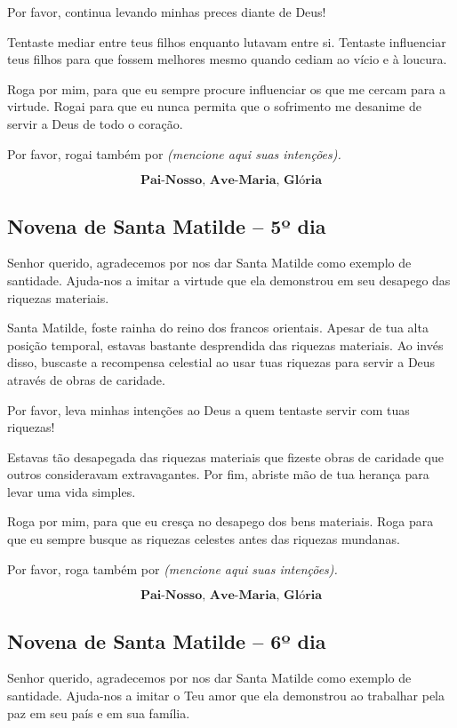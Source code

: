 \documentclass[a4paper,14pt]{extarticle} \usepackage[utf8]{inputenc}
\begin{document}
Por favor, continua levando minhas preces diante de Deus!

Tentaste mediar entre teus filhos enquanto lutavam entre si. Tentaste influenciar teus filhos para que fossem melhores mesmo quando cediam ao vício e à loucura.

Roga por mim, para que eu sempre procure influenciar os que me cercam para a virtude. Rogai para que eu nunca permita que o sofrimento me desanime de servir a Deus de todo o coração.

Por favor, rogai também por \textit{(mencione aqui suas intenções).}

\[\textbf{Pai-Nosso, Ave-Maria, Glória}\]


\subsection{Novena de Santa Matilde – 5º dia}



Senhor querido, agradecemos por nos dar Santa Matilde como exemplo de santidade. Ajuda-nos a imitar a virtude que ela demonstrou em seu desapego das riquezas materiais.

Santa Matilde, foste rainha do reino dos francos orientais. Apesar de tua alta posição temporal, estavas bastante desprendida das riquezas materiais. Ao invés disso, buscaste a recompensa celestial ao usar tuas riquezas para servir a Deus através de obras de caridade.

Por favor, leva minhas intenções ao Deus a quem tentaste servir com tuas riquezas!

Estavas tão desapegada das riquezas materiais que fizeste obras de caridade que outros consideravam extravagantes. Por fim, abriste mão de tua herança para levar uma vida simples.

Roga por mim, para que eu cresça no desapego dos bens materiais. Roga para que eu sempre busque as riquezas celestes antes das riquezas mundanas.

Por favor, roga também por \textit{(mencione aqui suas intenções).}

\[\textbf{Pai-Nosso, Ave-Maria, Glória}\]


\subsection{Novena de Santa Matilde – 6º dia}



Senhor querido, agradecemos por nos dar Santa Matilde como exemplo de santidade. Ajuda-nos a imitar o Teu amor que ela demonstrou ao trabalhar pela paz em seu país e em sua família.
\end{document}
